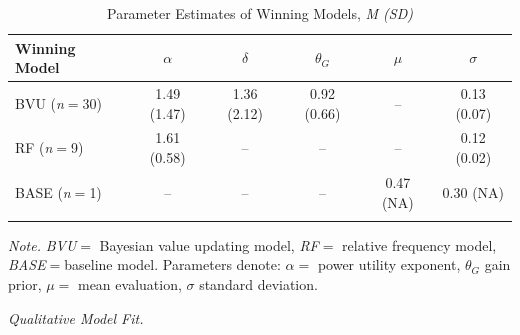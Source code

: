 \documentclass[a4paper, man, floatsintext]{apa6}
\begin{document}
\begin{table}[tbp]
\begin{center}
\begin{threeparttable}
\caption{\label{tab:study1_parameter}Parameter Estimates of Winning Models, \textit{M (SD)}}
\begin{tabular}{lccccc}
\toprule
Winning Model & $\alpha$ & $\delta$ & $\theta_G$ & $\mu$ & $\sigma$\\
\midrule
BVU (\textit{n}$=$30) & 1.49 (1.47) & 1.36 (2.12) & 0.92 (0.66) & -- & 0.13 (0.07)\\
RF (\textit{n}$=$9) & 1.61 (0.58) & -- & -- & -- & 0.12 (0.02)\\
BASE (\textit{n}$=$1) & -- & -- & -- & 0.47 (NA) & 0.30 (NA)\\
\bottomrule
\addlinespace
\end{tabular}
\begin{tablenotes}[para]
\normalsize{\textit{Note.} \textit{BVU}$=$ Bayesian value updating model, \textit{RF}$=$ relative frequency model, \textit{BASE}$=$baseline model. Parameters denote: $\alpha=$ power utility exponent, $\theta_G$ gain prior, $\mu=$ mean evaluation, $\sigma$ standard deviation.}
\end{tablenotes}
\end{threeparttable}
\end{center}
\end{table}

\textit{Qualitative Model Fit.}
\end{document}
